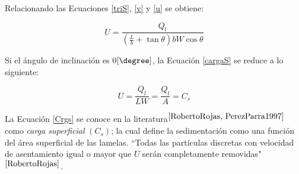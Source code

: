 Relacionando las Ecuaciones \ref{triS}, \ref{v} y \ref{u} se obtiene:

\begin{equation}
	\boxed{U = \frac{Q_l}{\left(\frac{L}{b} +  \tan \theta \right) b W \cos \theta } }
	\label{cargaS}
\end{equation}

\noindent
\justify

Si el \'angulo de inclinaci\'on es $0 [\degree]$, la Ecuaci\'on \ref{cargaS} se reduce a lo siguiente:

\begin{equation}
	U = \frac{Q_l}{L W} = \frac{Q_l}{A} = C_s
	\label{Crgs}
\end{equation}

\noindent
\justify

La Ecuaci\'on \ref{Crgs} se conoce en la literatura$^{\cite{RobertoRojas, PerezParra1997}}$ como \textit{carga superficial} $(C_s)$; la cual define la sedimentaci\'on como una funci\'on del \'area superficial de las lamelas. ``Todas las part\'iculas discretas con velocidad de asentamiento igual o mayor que $U$ ser\'an completamente removidas"$^{\cite{RobertoRojas}}$.
